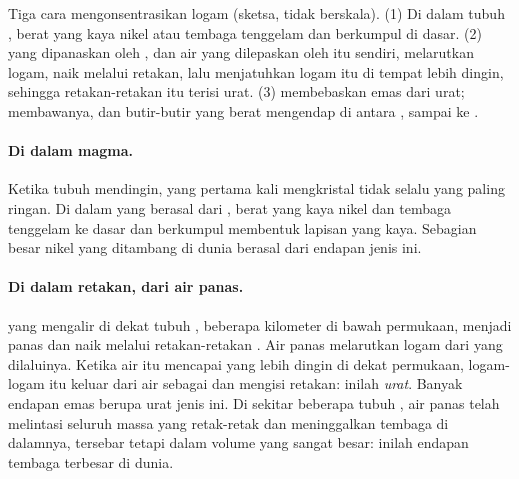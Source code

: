 \begin{omfigure}
{\small Tiga cara mengonsentrasikan logam (sketsa, tidak berskala). (1) Di
dalam tubuh ,  berat yang kaya nikel atau tembaga tenggelam
dan berkumpul di dasar. (2)  yang dipanaskan oleh , dan air
yang dilepaskan oleh  itu sendiri, melarutkan logam, naik melalui
retakan, lalu menjatuhkan logam itu di tempat  lebih dingin,
sehingga retakan-retakan itu terisi urat. (3)  membebaskan emas dari
urat;  membawanya, dan butir-butir yang berat mengendap di antara
, sampai ke .}
\label{fig:g9:earth-resources:deposits}
\end{omfigure}

\paragraph{Di dalam magma.} Ketika tubuh  mendingin,  yang
pertama kali mengkristal tidak selalu yang paling ringan. Di dalam 
yang berasal dari ,  berat yang kaya nikel dan tembaga
tenggelam ke dasar dan berkumpul membentuk lapisan yang kaya. Sebagian
besar nikel yang ditambang di dunia berasal dari endapan jenis ini.

\paragraph{Di dalam retakan, dari air panas.}  yang mengalir di
dekat tubuh , beberapa kilometer di bawah permukaan, menjadi panas
dan naik melalui retakan-retakan . Air panas melarutkan logam dari
 yang dilaluinya. Ketika air itu mencapai  yang lebih dingin
di dekat permukaan, logam-logam itu keluar dari air sebagai  dan
mengisi retakan: inilah \emph{urat}. Banyak endapan
emas berupa urat jenis ini. Di sekitar beberapa tubuh , air panas
telah melintasi seluruh massa  yang retak-retak dan meninggalkan
tembaga di dalamnya, tersebar tetapi dalam volume yang sangat besar:
inilah endapan tembaga terbesar di dunia.

